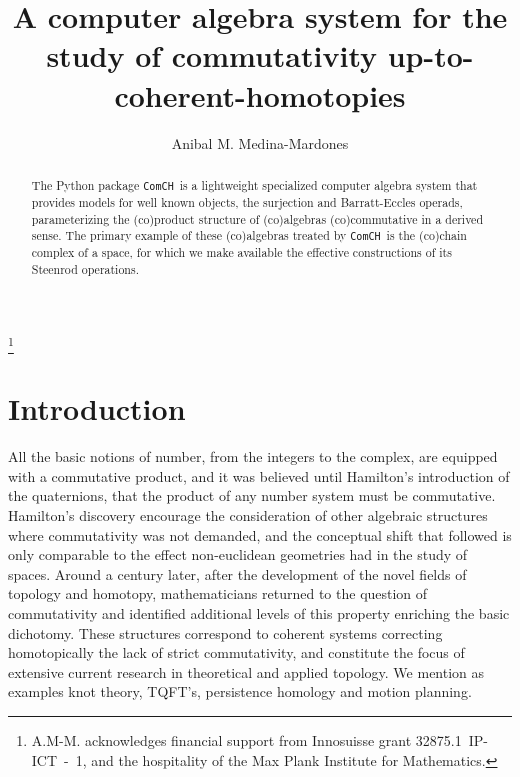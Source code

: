 \documentclass{amsart}
\newcommand{\comch}{\texttt{ComCH}}
\begin{document}
\title[A C.A.S. for the study of commutativity up-to-coherent-homotopies]{A computer algebra system for the study of commutativity up-to-coherent-homotopies}
\author{Anibal M. Medina-Mardones}
\address{Max Plank Institute for Mathematics, Bonn, Germany}
\address{Department of Mathematics, University of Notre Dame, Notre Dame, IN, USA}
\thanks{A.M-M. acknowledges financial support from Innosuisse grant \mbox{32875.1 IP-ICT - 1}, and the hospitality of the Max Plank Institute for Mathematics.}

\begin{abstract}
	The Python package \comch\, is a lightweight specialized computer algebra system that provides models for well known objects, the surjection and Barratt-Eccles operads, parameterizing the (co)product structure of (co)algebras (co)commutative in a derived sense. The primary example of these (co)algebras treated by \comch\, is the (co)chain complex of a space, for which we make available the effective constructions of its Steenrod operations.
\end{abstract} 

\maketitle

\section{Introduction}

All the basic notions of number, from the integers to the complex, are equipped with a commutative product, and it was believed until Hamilton's introduction of the quaternions, that the product of any number system must be commutative. Hamilton's discovery encourage the consideration of other algebraic structures where commutativity was not demanded, and the conceptual shift that followed is only comparable to the effect non-euclidean geometries had in the study of spaces. Around a century later, after the development of the novel fields of topology and homotopy, mathematicians returned to the question of commutativity and identified additional levels of this property enriching the basic dichotomy. These structures correspond to coherent systems correcting homotopically the lack of strict commutativity, and constitute the focus of extensive current research in theoretical and applied topology. We mention as examples knot theory, TQFT's, persistence homology and motion planning.
\end{document}
